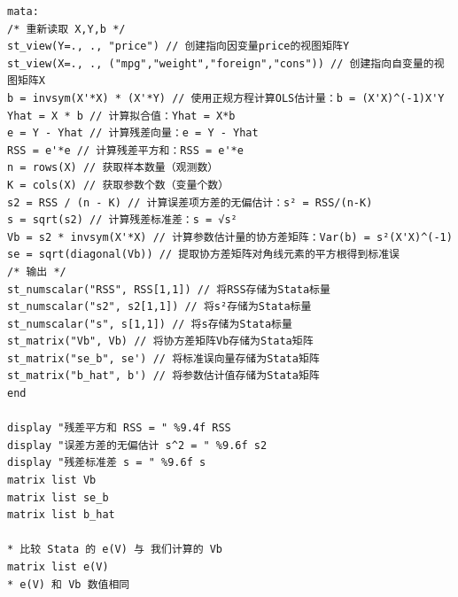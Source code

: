\begin{tcolorbox}[title=在 Stata 的 Mata 中计算残差、SSR、$s^2$ 与协方差矩阵、标准误, colback=white, colframe=black, colbacktitle=white, coltitle=black,fonttitle=\bfseries]
	\begin{lstlisting}[xleftmargin=2em, commentstyle=\color{black}]
mata:
/* 重新读取 X,Y,b */
st_view(Y=., ., "price") // 创建指向因变量price的视图矩阵Y
st_view(X=., ., ("mpg","weight","foreign","cons")) // 创建指向自变量的视图矩阵X
b = invsym(X'*X) * (X'*Y) // 使用正规方程计算OLS估计量：b = (X'X)^(-1)X'Y
Yhat = X * b // 计算拟合值：Yhat = X*b
e = Y - Yhat // 计算残差向量：e = Y - Yhat
RSS = e'*e // 计算残差平方和：RSS = e'*e
n = rows(X) // 获取样本数量（观测数）
K = cols(X) // 获取参数个数（变量个数）
s2 = RSS / (n - K) // 计算误差项方差的无偏估计：s² = RSS/(n-K)
s = sqrt(s2) // 计算残差标准差：s = √s²
Vb = s2 * invsym(X'*X) // 计算参数估计量的协方差矩阵：Var(b) = s²(X'X)^(-1)
se = sqrt(diagonal(Vb)) // 提取协方差矩阵对角线元素的平方根得到标准误
/* 输出 */
st_numscalar("RSS", RSS[1,1]) // 将RSS存储为Stata标量
st_numscalar("s2", s2[1,1]) // 将s²存储为Stata标量
st_numscalar("s", s[1,1]) // 将s存储为Stata标量
st_matrix("Vb", Vb) // 将协方差矩阵Vb存储为Stata矩阵
st_matrix("se_b", se') // 将标准误向量存储为Stata矩阵
st_matrix("b_hat", b') // 将参数估计值存储为Stata矩阵
end

display "残差平方和 RSS = " %9.4f RSS
display "误差方差的无偏估计 s^2 = " %9.6f s2
display "残差标准差 s = " %9.6f s
matrix list Vb
matrix list se_b
matrix list b_hat

* 比较 Stata 的 e(V) 与 我们计算的 Vb
matrix list e(V)
* e(V) 和 Vb 数值相同
	\end{lstlisting}

\end{tcolorbox}
